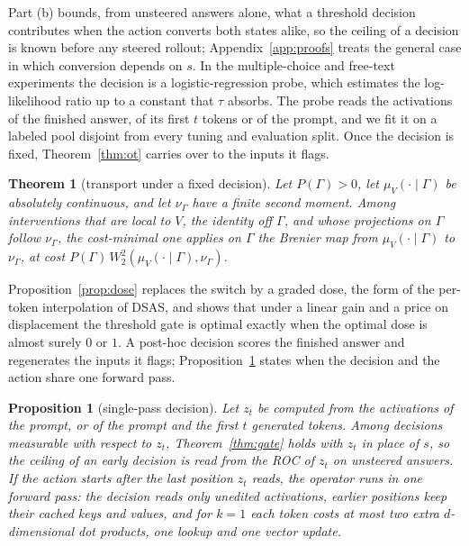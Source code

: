 \documentclass{article}
\newtheorem{theorem}{Theorem}
\newtheorem{proposition}{Proposition}
\newcommand{\Wtwo}{W_2}
\begin{document}
Part (b) bounds, from unsteered answers alone, what a threshold decision
contributes when the action converts both states alike, so the ceiling of a
decision is known before any steered rollout; Appendix~\ref{app:proofs} treats
the general case in which conversion depends on $s$. In the multiple-choice and free-text experiments the decision is a
logistic-regression probe, which estimates the log-likelihood ratio up to a
constant that $\tau$ absorbs. The probe reads the activations of the finished
answer, of its first $t$ tokens or of the prompt, and we fit it on a labeled
pool disjoint from every tuning and evaluation split. Once the decision is
fixed, Theorem~\ref{thm:ot} carries over to the inputs it
flags.

\begin{theorem}[transport under a fixed decision]
\label{thm:joint}
Let $P(\Gamma)>0$, let $\mu_V(\cdot\mid\Gamma)$ be absolutely continuous, and
let $\nu_\Gamma$ have a finite second moment. Among interventions that are
local to $V$, the identity off $\Gamma$, and whose projections on $\Gamma$
follow $\nu_\Gamma$, the cost-minimal one applies on $\Gamma$ the Brenier map
from $\mu_V(\cdot\mid\Gamma)$ to $\nu_\Gamma$, at cost
$P(\Gamma)\,\Wtwo^2(\mu_V(\cdot\mid\Gamma),\nu_\Gamma)$.
\end{theorem}

Proposition~\ref{prop:dose} replaces the switch by a graded dose, the form
of the per-token interpolation of DSAS, and shows that under a linear gain and
a price on displacement the threshold gate is optimal exactly when the optimal
dose is almost surely $0$ or $1$. A post-hoc decision
scores the finished answer and regenerates the inputs it flags;
Proposition~\ref{prop:seq} states when the decision and the action share one
forward pass.

\begin{proposition}[single-pass decision]
\label{prop:seq}
Let $z_t$ be computed from the activations of the prompt, or of the prompt and
the first $t$ generated tokens. Among decisions measurable with respect to
$z_t$, Theorem~\ref{thm:gate} holds with $z_t$ in place of $s$, so the ceiling
of an early decision is read from the ROC of $z_t$ on unsteered answers. If the
action starts after the last position $z_t$ reads, the operator runs in one
forward pass: the decision reads only unedited activations, earlier positions
keep their cached keys and values, and for $k=1$ each token costs at most two extra
$d$-dimensional dot products, one lookup and one vector update.
\end{proposition}
\end{document}
